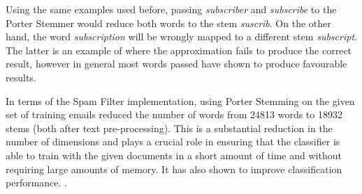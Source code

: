 Using the same examples used before, passing {\it subscriber} and {\it subscribe} to the Porter Stemmer would reduce both words to the stem {\it suscrib}. On the other hand, the word {\it subscription} will be wrongly mapped to a different stem {\it subscript}. The latter is an example of where the approximation fails to produce the correct result, however in general most words passed have shown to produce favourable results.

In terms of the Spam Filter implementation, using Porter Stemming on the given set of training emails reduced the number of words from 24813 words to 18932 stems (both after text pre-processing). This is a substantial reduction in the number of dimensions and plays a crucial role in ensuring that the classifier is able to train with the given documents in a short amount of time and without requiring large amounts of memory. It has also shown to improve classification performance. .


